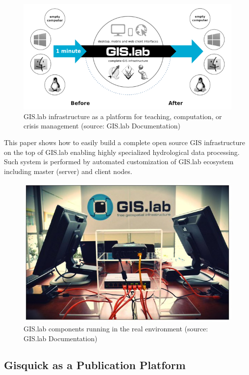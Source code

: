 \documentclass{isprs}
\begin{document}
\begin{figure}[ht!]
\begin{center}
  \includegraphics[width=0.8\columnwidth]{figures/gislab-architecture.png}
  \caption{GIS.lab infrastructure as a platform for teaching,
    computation, or crisis management (source: GIS.lab Documentation)}
\label{fig:gislab_infrastructure}
\end{center}
\end{figure}

This paper shows how to easily build a complete open source GIS
infrastructure on the top of GIS.lab enabling highly specialized
hydrological data processing. Such system is performed by automated
customization of GIS.lab ecosystem including master (server) and
client nodes.

\begin{figure}[ht!]
\begin{center}
  \includegraphics[width=0.7\columnwidth]{figures/gislab-real.jpg}
  \caption{GIS.lab components running in the real environment (source:
    GIS.lab Documentation)}
\label{fig:gislab_infrastructure}
\end{center}
\end{figure}

\subsection{Gisquick as a Publication Platform}
\end{document}
